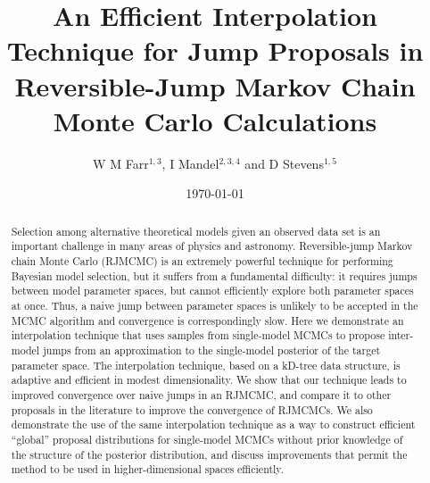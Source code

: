 \documentclass{rsos}
\begin{document}
\title[Efficient Jump Proposals in RJMCMC]{An Efficient Interpolation
  Technique for Jump Proposals in Reversible-Jump Markov Chain Monte
  Carlo Calculations}

\date{\today}

\author{W M Farr$^{1,3}$, I Mandel$^{2,3,4}$ and D Stevens$^{1,5}$}

\address{\small{$^1$ Center for Interdisciplinary Exploration and Research in
  Astrophysics (CIERA), Department of Physics and Astronomy,
  Northwestern University, Evanston IL USA\\
$^2$ MIT Kavli Institute, Cambridge MA USA\\
$^3$ School of Physics and Astronomy, University of
  Birmingham, Birmingham UK\\
$^4$ Monash Center for Astrophysics and School of Physics and Astronomy, Monash University, Clayton, VIC Australia\\
$^5$ Department of Astronomy, The Ohio State
  University, Columbus OH USA}}

\subject{Astrostatistics, Data Analysis, Markov chain Monte Carlo}



\begin{abstract}
Selection among alternative theoretical models given an observed data set is an important challenge in many areas of physics and astronomy.  Reversible-jump Markov chain Monte Carlo (RJMCMC) is an extremely powerful technique for performing Bayesian model selection, but it suffers from a fundamental difficulty: it requires jumps between model parameter spaces, but cannot efficiently explore both parameter spaces at once.  Thus, a naive jump between parameter spaces is unlikely to be accepted in the MCMC algorithm and convergence is correspondingly slow.  Here we demonstrate an interpolation technique that uses samples from single-model MCMCs to propose inter-model jumps from an approximation to the single-model posterior of the target parameter space.  The interpolation technique, based on a kD-tree data structure, is adaptive and efficient in modest dimensionality.  We show that our technique leads to improved convergence over naive jumps in an RJMCMC, and compare it to other proposals in the literature to improve the convergence of RJMCMCs.  We also demonstrate the use of the same interpolation technique as a way to construct efficient ``global'' proposal distributions for single-model MCMCs without prior knowledge of the structure of the posterior distribution, and discuss improvements that permit the method to be used in higher-dimensional spaces efficiently.
\end{abstract}
\end{document}
